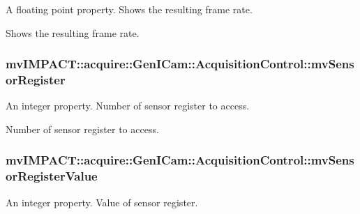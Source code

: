 A floating point property. Shows the resulting frame rate. 

Shows the resulting frame rate. \hypertarget{classmv_i_m_p_a_c_t_1_1acquire_1_1_gen_i_cam_1_1_acquisition_control_a985987bd6fa29ef835556c49a20e133d}{
\subsubsection[{mv\+Sensor\+Register}]{ mv\+I\+M\+P\+A\+C\+T\+::acquire\+::\+Gen\+I\+Cam\+::\+Acquisition\+Control\+::mv\+Sensor\+Register}}\label{classmv_i_m_p_a_c_t_1_1acquire_1_1_gen_i_cam_1_1_acquisition_control_a985987bd6fa29ef835556c49a20e133d}


An integer property. Number of sensor register to access. 

Number of sensor register to access. \hypertarget{classmv_i_m_p_a_c_t_1_1acquire_1_1_gen_i_cam_1_1_acquisition_control_a8ef065f9dd3a514f02f32b5c146919b4}{
\subsubsection[{mv\+Sensor\+Register\+Value}]{ mv\+I\+M\+P\+A\+C\+T\+::acquire\+::\+Gen\+I\+Cam\+::\+Acquisition\+Control\+::mv\+Sensor\+Register\+Value}}\label{classmv_i_m_p_a_c_t_1_1acquire_1_1_gen_i_cam_1_1_acquisition_control_a8ef065f9dd3a514f02f32b5c146919b4}


An integer property. Value of sensor register. 

